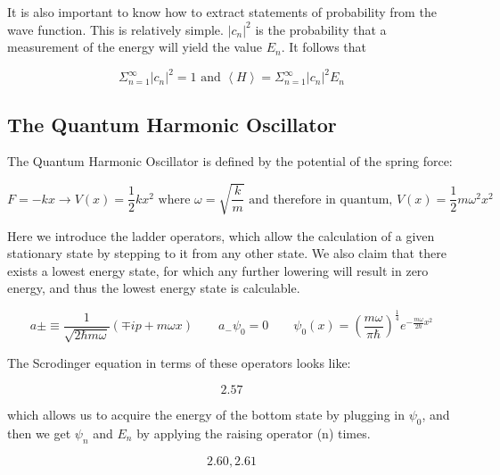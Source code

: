 \documentclass[aps,pre,nofootinbib]{revtex4}
\begin{document}
It is also important to know how to extract statements of probability from the wave function.  This is relatively simple.  $|c_n|^2$ is the probability that a measurement of the energy will yield the value $E_n$.  It follows that

\begin{equation}
\Sigma^{\infty}_{n=1}|c_n|^2 = 1 \textrm{  and  } \left\langle H\right\rangle = \Sigma^{\infty}_{n=1}|c_n|^2 E_n
\end{equation}

\subsection{The Quantum Harmonic Oscillator}

The Quantum Harmonic Oscillator is defined by the potential of the spring force:

\begin{equation}
F = -kx \rightarrow V(x) = \frac{1}{2}kx^2 \textrm{  where  } \omega = \sqrt{\frac{k}{m}} \textrm{  and therefore in quantum,  } V(x) = \frac{1}{2} m\omega^2x^2
\end{equation}

Here we introduce the ladder operators, which allow the calculation of a given stationary state by stepping to it from any other state.  We also claim that there exists a lowest energy state, for which any further lowering will result in zero energy, and thus the lowest energy state is calculable.  

\begin{equation}
a\pm \equiv \frac{1}{\sqrt{2\hbar m \omega}}(\mp ip + m\omega x) \quad \quad a_-\psi_0 = 0 \quad \quad 
\psi_0(x) = (\frac{m\omega}{\pi \hbar})^{\frac{1}{4}}e^{-\frac{m \omega}{2 \hbar}x^2}
\end{equation}

The Scrodinger equation in terms of these operators looks like:

\begin{equation}
2.57
\end{equation}

which allows us to acquire the energy of the bottom state by plugging in $\psi_0$, and then we get $\psi_n$ and $E_n$ by  applying the raising operator (n) times.  

\begin{equation}
2.60, 2.61
\end{equation}
\end{document}
